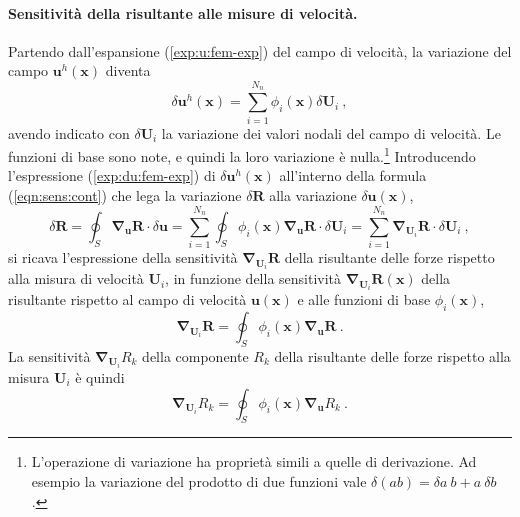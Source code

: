 \paragraph{Sensitività della risultante alle misure di velocità.}
Partendo dall'espansione (\ref{exp:u:fem-exp}) del campo di velocità, la variazione del campo $\bm{u}^h(\bm{x})$ diventa
\begin{equation}\label{exp:du:fem-exp}
 \delta \bm{u}^h(\bm{x}) = \displaystyle\sum_{i=1}^{N_n} \phi_i(\bm{x}) \delta \bm{U}_i \ ,
\end{equation}
avendo indicato con $\delta \bm{U}_i$ la variazione dei valori nodali del campo di velocità. Le funzioni di base sono note, e quindi la loro variazione è nulla.\footnote{L'operazione di variazione ha proprietà simili a quelle di derivazione. Ad esempio la variazione del prodotto di due funzioni vale $\delta(ab) = \delta a \ b + a \ \delta b$.}
%
Introducendo l'espressione (\ref{exp:du:fem-exp}) di $\delta \bm{u}^h(\bm{x})$ all'interno della formula (\ref{eqn:sens:cont}) che lega la variazione $\delta \bm{R}$ alla variazione $\delta \bm{u}(\bm{x})$,
\begin{equation}
 \delta \bm{R} = \oint_S \bm{\nabla}_{\bm{u}} \bm{R} \cdot \delta \bm{u} 
  = \sum_{i=1}^{N_n} \oint_S \phi_i(\bm{x}) \bm{\nabla}_{\bm{u}} \bm{R} \cdot \delta \bm{U}_i  
 = \sum_{i=1}^{N_n} \bm{\nabla}_{\bm{U}_i} \bm{R} \cdot \delta \bm{U}_i \ ,
\end{equation}
 si ricava l'espressione della sensitività $\bm{\nabla}_{\bm{U}_i} \bm{R}$ della risultante delle forze rispetto alla misura di velocità $\bm{U}_i$, in funzione della sensitività $\bm{\nabla}_{\bm{U}_i} \bm{R}(\bm{x})$ della risultante rispetto al campo di velocità $\bm{u}(\bm{x})$ e alle funzioni di base $\phi_i(\bm{x})$,
\begin{equation}
 \bm{\nabla}_{\bm{U}_i} \bm{R} = \oint_S \phi_i(\bm{x}) \bm{\nabla}_{\bm{u}} \bm{R} \ .
\end{equation}
La sensitività $\bm{\nabla}_{\bm{U}_i} R_k$ della componente $R_k$ della risultante delle forze rispetto alla misura $\bm{U}_i$ è quindi
\begin{equation}
 \bm{\nabla}_{\bm{U}_i} R_k 
  = \oint_S \phi_i(\bm{x}) \bm{\nabla}_{\bm{u}} R_k \ . 
\end{equation}


